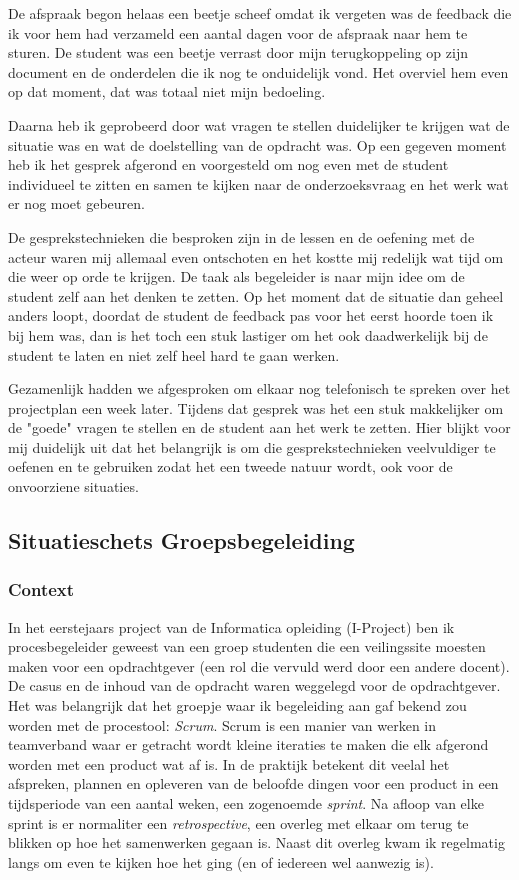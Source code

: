 De afspraak begon helaas een beetje scheef omdat ik vergeten was de feedback die ik voor hem had verzameld een aantal dagen voor de afspraak naar hem te sturen. De student was een beetje verrast door mijn terugkoppeling op zijn document en de onderdelen die ik nog te onduidelijk vond. Het overviel hem even op dat moment, dat was totaal niet mijn bedoeling. 

Daarna heb ik geprobeerd door wat vragen te stellen duidelijker te krijgen wat de situatie was en wat de doelstelling van de opdracht was. Op een gegeven moment heb ik het gesprek afgerond en voorgesteld om nog even met de student individueel te zitten en samen te kijken naar de onderzoeksvraag en het werk wat er nog moet gebeuren.

De gesprekstechnieken die besproken zijn in de lessen en de oefening met de acteur waren mij allemaal even ontschoten en het kostte mij redelijk wat tijd om die weer op orde te krijgen. De taak als begeleider is naar mijn idee om de student zelf aan het denken te zetten. Op het moment dat de situatie dan geheel anders loopt, doordat de student de feedback pas voor het eerst hoorde toen ik bij hem was, dan is het toch een stuk lastiger om het ook daadwerkelijk bij de student te laten en niet zelf heel hard te gaan werken. 

Gezamenlijk hadden we afgesproken om elkaar nog telefonisch te spreken over het projectplan een week later. Tijdens dat gesprek was het een stuk makkelijker om de "goede" vragen te stellen en de student aan het werk te zetten. Hier blijkt voor mij duidelijk uit dat het belangrijk is om die gesprekstechnieken veelvuldiger te oefenen en te gebruiken zodat het een tweede natuur wordt, ook voor de onvoorziene situaties.


\subsection{Situatieschets Groepsbegeleiding}
\label{sec:groep}
\subsubsection{Context}
In het eerstejaars project van de Informatica opleiding (I-Project) ben ik procesbegeleider geweest van een groep studenten die een veilingssite moesten maken voor een opdrachtgever (een rol die vervuld werd door een andere docent). De casus en de inhoud van de opdracht waren weggelegd voor de opdrachtgever. Het was belangrijk dat het groepje waar ik begeleiding aan gaf bekend zou worden met de procestool: \textit{Scrum}. Scrum is een manier van werken in teamverband waar er getracht wordt kleine iteraties te maken die elk afgerond worden met een product wat af is. In de praktijk betekent dit veelal het afspreken, plannen en opleveren van de beloofde dingen voor een product in een tijdsperiode van een aantal weken, een zogenoemde \textit{sprint}. Na afloop van elke sprint is er normaliter een \textit{retrospective}, een overleg met elkaar om terug te blikken op hoe het samenwerken gegaan is. Naast dit overleg kwam ik regelmatig langs om even te kijken hoe het ging (en of iedereen wel aanwezig is).


